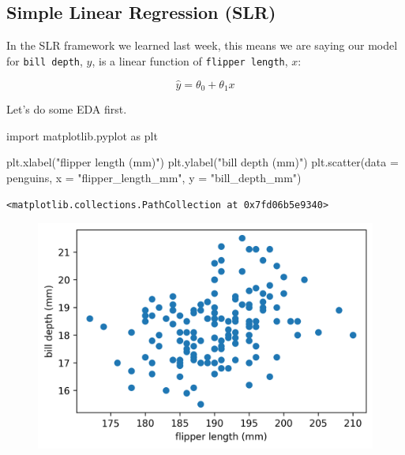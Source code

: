 \documentclass[
  letterpaper,
  DIV=11,
  numbers=noendperiod]{scrreprt}
\newenvironment{Shaded}{\begin{snugshade}}{\end{snugshade}}
\newcommand{\ImportTok}[1]{\textcolor[rgb]{0.00,0.46,0.62}{#1}}
\newcommand{\NormalTok}[1]{\textcolor[rgb]{0.00,0.23,0.31}{#1}}
\newcommand{\OperatorTok}[1]{\textcolor[rgb]{0.37,0.37,0.37}{#1}}
\newcommand{\StringTok}[1]{\textcolor[rgb]{0.13,0.47,0.30}{#1}}
\begin{document}
\hypertarget{simple-linear-regression-slr}{%
\subsection{Simple Linear Regression
(SLR)}\label{simple-linear-regression-slr}}

In the SLR framework we learned last week, this means we are saying our
model for \texttt{bill\ depth}, \(y\), is a linear function of
\texttt{flipper\ length}, \(x\):

\[\hat{y} = \theta_0 + \theta_1 x\]

Let's do some EDA first.

\begin{Shaded}
\begin{Highlighting}[]
\ImportTok{import}\NormalTok{ matplotlib.pyplot }\ImportTok{as}\NormalTok{ plt}

\NormalTok{plt.xlabel(}\StringTok{"flipper length (mm)"}\NormalTok{)}
\NormalTok{plt.ylabel(}\StringTok{"bill depth (mm)"}\NormalTok{)}
\NormalTok{plt.scatter(data }\OperatorTok{=}\NormalTok{ penguins, x }\OperatorTok{=} \StringTok{"flipper\_length\_mm"}\NormalTok{, y }\OperatorTok{=} \StringTok{"bill\_depth\_mm"}\NormalTok{)}
\end{Highlighting}
\end{Shaded}

\begin{verbatim}
<matplotlib.collections.PathCollection at 0x7fd06b5e9340>
\end{verbatim}

\begin{figure}[H]

{\centering \includegraphics{gradient_descent/gradient_descent_files/figure-pdf/cell-4-output-2.png}

}

\end{figure}
\end{document}
